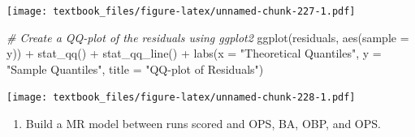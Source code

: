 \documentclass[
  11pt,
]{book}
\newenvironment{Shaded}{\begin{snugshade}}{\end{snugshade}}
\newcommand{\AttributeTok}[1]{\textcolor[rgb]{0.77,0.63,0.00}{#1}}
\newcommand{\CommentTok}[1]{\textcolor[rgb]{0.56,0.35,0.01}{\textit{#1}}}
\newcommand{\FunctionTok}[1]{\textcolor[rgb]{0.00,0.00,0.00}{#1}}
\newcommand{\NormalTok}[1]{#1}
\newcommand{\SpecialCharTok}[1]{\textcolor[rgb]{0.00,0.00,0.00}{#1}}
\newcommand{\StringTok}[1]{\textcolor[rgb]{0.31,0.60,0.02}{#1}}
\providecommand{\tightlist}{%
  \setlength{\itemsep}{0pt}\setlength{\parskip}{0pt}}
\theoremstyle{definition}
\theoremstyle{definition}
\theoremstyle{definition}
\theoremstyle{definition}
\theoremstyle{remark}
\begin{document}
\texttt{[image: textbook\_files/figure-latex/unnamed-chunk-227-1.pdf]}

\newpage

\begin{Shaded}
\begin{Highlighting}[]
\CommentTok{\# Create a QQ{-}plot of the residuals using ggplot2}
\FunctionTok{ggplot}\NormalTok{(residuals, }\FunctionTok{aes}\NormalTok{(}\AttributeTok{sample =}\NormalTok{ y)) }\SpecialCharTok{+}
  \FunctionTok{stat\_qq}\NormalTok{() }\SpecialCharTok{+}
  \FunctionTok{stat\_qq\_line}\NormalTok{() }\SpecialCharTok{+}
  \FunctionTok{labs}\NormalTok{(}\AttributeTok{x =} \StringTok{"Theoretical Quantiles"}\NormalTok{, }\AttributeTok{y =} \StringTok{"Sample Quantiles"}\NormalTok{, }\AttributeTok{title =} \StringTok{"QQ{-}plot of Residuals"}\NormalTok{)}
\end{Highlighting}
\end{Shaded}

\texttt{[image: textbook\_files/figure-latex/unnamed-chunk-228-1.pdf]}

\newpage

\begin{enumerate}
\def\labelenumi{(\alph{enumi})}
\setcounter{enumi}{5}
\tightlist
\item
  Build a MR model between runs scored and OPS, BA, OBP, and OPS.
\end{enumerate}
\end{document}
